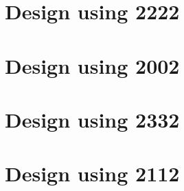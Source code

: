 \section{Design using 2222}


 \begin{center}




 \end{center}



\section{Design using 2002}


 \begin{center}




 \end{center}



\section{Design using 2332}


 \begin{center}




 \end{center}



\section{Design using 2112}

